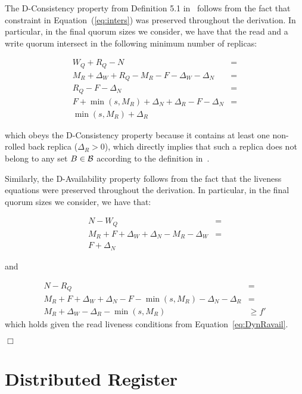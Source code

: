 \begin{dem}
The D-Consistency property from Definition 5.1
in~\cite{Malkhi:Reiter:BQS:98} follows from the fact that
constraint in Equation~(\ref{eq:inters}) was preserved
throughout the derivation. In particular, in the final quorum
sizes we consider, we have that the read and a write quorum
intersect in the following minimum number of replicas:

\begin{align*}
  W_Q + R_Q - N &=\\
  M_R + \Delta_W + R_Q - M_R - F - \Delta_W - \Delta_N  &=\\
  R_Q - F - \Delta_N  &=\\
  F + \min(s, M_R) + \Delta_N + \Delta_R - F - \Delta_N  &=\\
  \min(s, M_R) + \Delta_R  &
\end{align*}

\noindent which obeys the D-Consistency property because it
contains at least one non-rolled back replica ($\Delta_R >
0$), which directly implies that such a replica does not
belong to any set $B \in \cal{B}$ according to the definition
in~\cite{Malkhi:Reiter:BQS:98}.

Similarly, the D-Availability property follows from the fact that
the liveness equations were preserved throughout the
derivation. In particular, in the final quorum sizes we
consider, we have that:

\begin{align*}
    N-W_Q &=\\
    M_R + F + \Delta_W + \Delta_N - M_R - \Delta_W &=\\
    F + \Delta_N&
\end{align*}

and

\begin{align*}
    N-R_Q &=\\
    M_R + F + \Delta_W + \Delta_N - F - \min(s, M_R) - \Delta_N - \Delta_R &=\\
    M_R + \Delta_W - \Delta_R - \min(s, M_R) &\ge f'
\end{align*}
\noindent which holds given the read liveness conditions from
Equation~\ref{eq:DynRavail}.

\hfill\ensuremath{\Box}\vspace{2em}

\end{dem}

\section{Distributed Register}\label{app:register}

